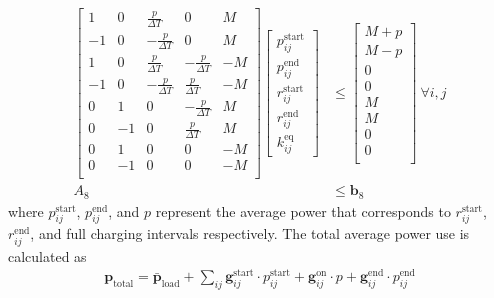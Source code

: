 \begin{equation}\begin{aligned}
	\begin{bmatrix} 
		 1 &  0 &  \frac{p}{\Delta T} &  0                  &  M\\
		-1 &  0 & -\frac{p}{\Delta T} &  0                  &  M\\
		 1 &  0 &  \frac{p}{\Delta T} & -\frac{p}{\Delta T} & -M\\ 
		-1 &  0 & -\frac{p}{\Delta T} &  \frac{p}{\Delta T} & -M\\
		 0 &  1 & 0                   & -\frac{p}{\Delta T} &  M\\
		 0 & -1 & 0                   &  \frac{p}{\Delta T} &  M\\
		 0 &  1 & 0                   &  0                  & -M\\
		 0 & -1 & 0                   &  0                  & -M\\
	\end{bmatrix} 
	\begin{bmatrix}
		p_{ij}^{\text{start}} \\
                p_{ij}^{\text{end}} \\
                r_{ij}^{\text{start}} \\
                r_{ij}^{\text{end}} \\
                k_{ij}^{\text{eq}}
	\end{bmatrix} &\le 
	\begin{bmatrix}
		M + p \\
		M - p \\
		0 \\
		0 \\
		M \\
		M \\
		0 \\
		0 \\
	\end{bmatrix} \ \forall i,j \\
	A_8 &\le \mathbf{b}_8
\end{aligned}\end{equation} 
where $p_{ij}^{\text{start}}$, $p_{ij}^{\text{end}}$, and $p$ represent the average power that corresponds to $r_{ij}^{\text{start}}$, $r_{ij}^{\text{end}}$, and full charging intervals respectively. The total average power use is calculated as 
\begin{align}\label{eqn:totalPower}
	\mathbf{p}_{\text{total}} = \bar{\mathbf{p}}_{\text{load}} + \sum_{ij} \mathbf{g}^{\text{start}}_{ij}\cdot p^{\text{start}}_{ij} + \mathbf{g}^{\text{on}}_{ij}\cdot p + \mathbf{g}^{\text{end}}_{ij}\cdot p^{\text{end}}_{ij}
\end{align}
